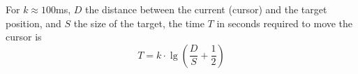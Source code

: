 \begin{definition} \label{def:fitts_law} 
  For $k \approx 100$ms, $D$ the distance between the current (cursor) and the target position, and $S$ the size of the target, the time $T$ in seconds required to move the cursor is
  \begin{equation*}
    T = k \cdot \lg \left( \frac{D}{S} + \frac{1}{2} \right)
  \end{equation*}
\end{definition}
